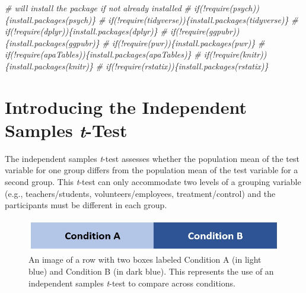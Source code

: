 \documentclass[
  11pt,
]{book}
\newenvironment{Shaded}{\begin{snugshade}}{\end{snugshade}}
\newcommand{\CommentTok}[1]{\textcolor[rgb]{0.37,0.37,0.37}{\textit{#1}}}
\begin{document}
\begin{Shaded}
\begin{Highlighting}[]
\CommentTok{\# will install the package if not already installed}
\CommentTok{\# if(!require(psych))\{install.packages(\textquotesingle{}psych\textquotesingle{})\}}
\CommentTok{\# if(!require(tidyverse))\{install.packages(\textquotesingle{}tidyverse\textquotesingle{})\}}
\CommentTok{\# if(!require(dplyr))\{install.packages(\textquotesingle{}dplyr\textquotesingle{})\}}
\CommentTok{\# if(!require(ggpubr))\{install.packages(\textquotesingle{}ggpubr\textquotesingle{})\}}
\CommentTok{\# if(!require(pwr))\{install.packages(\textquotesingle{}pwr\textquotesingle{})\}}
\CommentTok{\# if(!require(apaTables))\{install.packages(\textquotesingle{}apaTables\textquotesingle{})\}}
\CommentTok{\# if(!require(knitr))\{install.packages(\textquotesingle{}knitr\textquotesingle{})\}}
\CommentTok{\# if(!require(rstatix))\{install.packages(\textquotesingle{}rstatix\textquotesingle{})\}}
\end{Highlighting}
\end{Shaded}

\hypertarget{introducing-the-independent-samples-t-test}{%
\section{\texorpdfstring{Introducing the Independent Samples \emph{t}-Test}{Introducing the Independent Samples t-Test}}\label{introducing-the-independent-samples-t-test}}

The independent samples \emph{t}-test assesses whether the population mean of the test variable for one group differs from the population mean of the test variable for a second group. This \emph{t}-test can only accommodate two levels of a grouping variable (e.g., teachers/students, volunteers/employees, treatment/control) and the participants must be different in each group.

\begin{figure}
\centering
\includegraphics{images/ttests/conditions_paired.jpg}
\caption{An image of a row with two boxes labeled Condition A (in light blue) and Condition B (in dark blue). This represents the use of an independent samples \emph{t}-test to compare across conditions.}
\end{figure}
\end{document}
